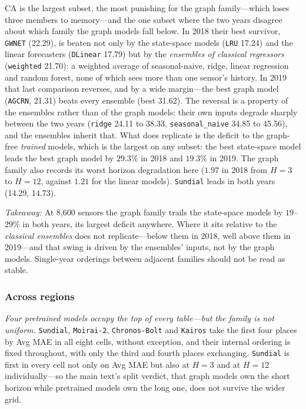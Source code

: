 CA is the largest subset, the most punishing for the graph family---which loses
three members to memory---and the one subset where the two years disagree about
which family the graph models fall below. In 2018 their best survivor,
\texttt{GWNET} (22.29), is beaten not only by the state-space models
(\texttt{LRU} 17.24) and the linear forecasters (\texttt{DLinear} 17.79) but by
the \emph{ensembles of classical regressors} (\texttt{weighted} 21.70): a
weighted average of seasonal-naive, ridge, linear regression and random forest,
none of which sees more than one sensor's history. In 2019 that last comparison
reverses, and by a wide margin---the best graph model (\texttt{AGCRN}, 21.31)
beats every ensemble (best 31.62). The reversal is a property of the ensembles
rather than of the graph models: their own inputs degrade sharply between the
two years (\texttt{ridge} 24.11 to 38.33, \texttt{seasonal\_naive} 34.85 to
45.56), and the ensembles inherit that. What does replicate is the deficit to
the graph-free \emph{trained} models, which is the largest on any subset: the
best state-space model leads the best graph model by $29.3\%$ in 2018 and
$19.3\%$ in 2019. The graph family also records its worst horizon degradation
here ($1.97$ in 2018 from $H{=}3$ to $H{=}12$, against $1.21$ for the linear
models). \texttt{Sundial} leads in both years (14.29, 14.73).

\begin{insightbox}
\textit{Takeaway:} At 8,600 sensors the graph family trails the state-space
models by $19$--$29\%$ in both years, its largest deficit anywhere. Where it
sits relative to the \emph{classical ensembles} does not replicate---below them
in 2018, well above them in 2019---and that swing is driven by the ensembles'
inputs, not by the graph models. Single-year orderings between adjacent families
should not be read as stable.
\end{insightbox}

\subsubsection{Across regions}
\label{app:extended:across}

\textit{Four pretrained models occupy the top of every table---but the family is
not uniform.} \texttt{Sundial}, \texttt{Moirai-2}, \texttt{Chronos-Bolt} and
\texttt{Kairos} take the first four places by Avg MAE in all eight cells,
without exception, and their internal ordering is fixed throughout, with only
the third and fourth places exchanging. \texttt{Sundial} is first in every cell
not only on Avg MAE but also at $H{=}3$ and at $H{=}12$ individually---so the
main text's split verdict, that graph models own the short horizon while
pretrained models own the long one, does not survive the wider grid.

